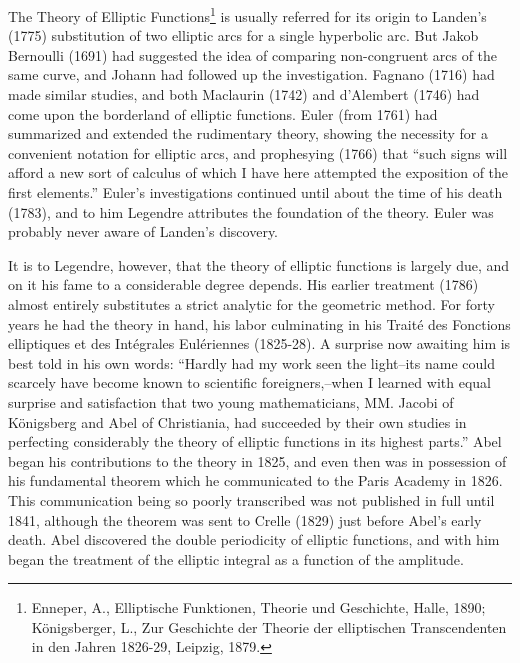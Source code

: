 \documentclass[oneside]{book}
\begin{document}
The Theory of Elliptic Functions\footnote{Enneper, A., Elliptische
Funktionen, Theorie und Geschichte, Halle, 1890; K\"onigsberger, L.,
Zur Geschichte der Theorie der elliptischen Transcendenten in den
Jahren 1826-29, Leipzig, 1879.} is usually referred for its origin
to Landen's (1775) substitution of two elliptic arcs for a single
hyperbolic arc. But Jakob Bernoulli (1691) had suggested the idea of
comparing non-congruent arcs of the same curve, and Johann had
followed up the investigation. Fagnano (1716) had made similar
studies, and both Maclaurin (1742) and d'Alembert (1746) had come
upon the borderland of elliptic functions. Euler (from 1761) had
summarized and extended the rudimentary theory, showing the
necessity for a convenient notation for elliptic arcs, and
prophesying (1766) that ``such signs will afford a new sort of
calculus of which I have here attempted the exposition of the first
elements.'' Euler's investigations continued until about the time of
his death (1783), and to him Legendre attributes the foundation of
the theory. Euler was probably never aware of Landen's discovery.

It is to Legendre, however, that the theory of elliptic functions is
largely due, and on it his fame to a considerable degree
depends. His earlier treatment (1786) almost entirely substitutes a
strict analytic for the geometric method. For forty years he had the
theory in hand, his labor culminating in his Trait\'e des Fonctions
elliptiques et des Int\'egrales Eul\'eriennes (1825-28). A surprise
now awaiting him is best told in his own words: ``Hardly had my work
seen the light--its name could scarcely have become known to
scientific foreigners,--when I learned with equal surprise and
satisfaction that two young mathematicians, MM. Jacobi of
K\"onigsberg and Abel of Christiania, had succeeded by their own
studies in perfecting considerably the theory of elliptic functions
in its highest parts.'' Abel began his contributions to the theory
in 1825, and even then was in possession of his fundamental theorem
which he communicated to the Paris Academy in 1826. This
communication being so poorly transcribed was not published in full
until 1841, although the theorem was sent to Crelle (1829) just
before Abel's early death. Abel discovered the double periodicity of
elliptic functions, and with him began the treatment of the elliptic
integral as a function of the amplitude.
\end{document}

